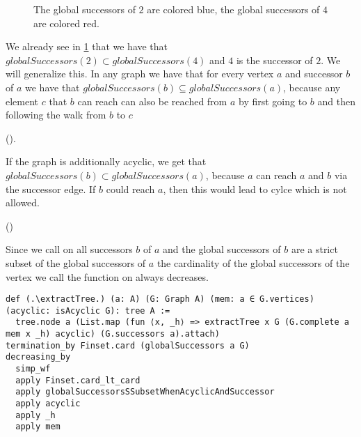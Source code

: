 \begin{figure}
    \centering
      \caption{The global successors of $2$ are colored blue, the global successors of $4$ are colored red.}
      \label{fig:globalSuccessors}
\end{figure}

We already see in \cref{fig:globalSuccessors} that we have that $globalSuccessors(2) \subset globalSuccessors(4)$ and $4$ is the successor of $2$. We will generalize this. In any graph we have that for every vertex $a$ and successor $b$ of $a$ we have that $globalSuccessors(b) \subseteq globalSuccessors(a)$, because any element $c$ that $b$ can reach can also be reached from $a$ by first going to $b$ and then following the walk from $b$ to $c$

(\globalSuccessorsSubsetWhenSuccessor).


If the graph is additionally acyclic, we get that $globalSuccessors(b) \subset globalSuccessors(a)$, because $a$ can reach $a$ and $b$ via the successor edge. If $b$ could reach $a$, then this would lead to cylce which is not allowed.

(\globalSuccessorsSSubsetWhenAcyclicAndSuccessor)

Since we call \extractTree on all successors $b$ of $a$ and the global successors of $b$ are a strict subset of the global successors of $a$ the cardinality of the global successors of the vertex we call the function on always decreases.

\begin{lstlisting}
def (.\extractTree.) (a: A) (G: Graph A) (mem: a ∈ G.vertices) (acyclic: isAcyclic G): tree A :=
  tree.node a (List.map (fun ⟨x, _h⟩ => extractTree x G (G.complete a mem x _h) acyclic) (G.successors a).attach)
termination_by Finset.card (globalSuccessors a G)
decreasing_by
  simp_wf
  apply Finset.card_lt_card
  apply globalSuccessorsSSubsetWhenAcyclicAndSuccessor
  apply acyclic
  apply _h
  apply mem
\end{lstlisting}

